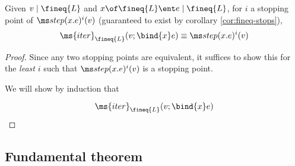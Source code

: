 \documentclass{article}
\newcommand{\iter}[4]{\ms{iter}_{#1}({#2}; \bind{#3}#4)}
\newcommand{\iterstep}[5]{\ms{iter}_{#1}({#2}; {#3}; {\bind{#4}#5})}
\newcommand{\step}{\mapsto}
\newcommand{\steps}{\step^*}
\newcommand{\lr}[2]{#2\mathrel{|}#1}
\newcommand{\lrcx}[3]{#1 \ent \lr{#2}{#3}}
\begin{document}
\begin{theorem}\label{thm:iter-stops}
  Given $\lr{\fineq{L}}{v}$ and $\lrcx{x\of\fineq{L}}{\fineq{L}}{e}$, for $i$ a
  stopping point of $\stepfn(x.e)^i(v)$ (guaranteed to exist by corollary
  \ref{cor:fineq-stops}),
  \[ \iter{\fineq{L}}{v}{x}{e} \equiv \stepfn(x.e)^i(v) \]
\end{theorem}
\begin{proof}
  Since any two stopping points are equivalent, it suffices to show this for the
  \emph{least} $i$ such that $\stepfn(x.e)^i(v)$ is a stopping point.

  We will show by induction that

  \[
  \iter{\fineq{L}}{v}{x}{e}
  \]

  \TODO


\end{proof}


\subsection{Fundamental theorem}
\end{document}
